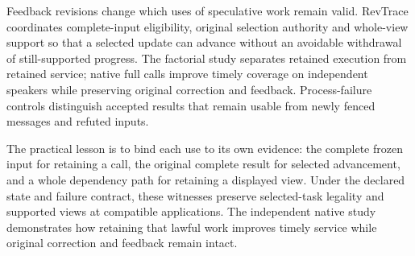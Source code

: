 Feedback revisions change which uses of speculative work remain valid.
RevTrace coordinates complete-input eligibility, original selection
authority and whole-view support so that a selected update can advance
without an avoidable withdrawal of still-supported progress. The
factorial study separates retained execution from retained service;
native full calls improve timely coverage on independent speakers while
preserving original correction and feedback. Process-failure controls
distinguish accepted results that remain usable from newly fenced
messages and refuted inputs.

The practical lesson is to bind each use to its own evidence: the complete
frozen input for retaining a call, the original complete result for
selected advancement, and a whole dependency path for retaining a
displayed view. Under the declared state and failure contract, these
witnesses preserve selected-task legality and supported views at
compatible applications. The independent native study demonstrates how
retaining that lawful work improves timely service while original
correction and feedback remain intact.
